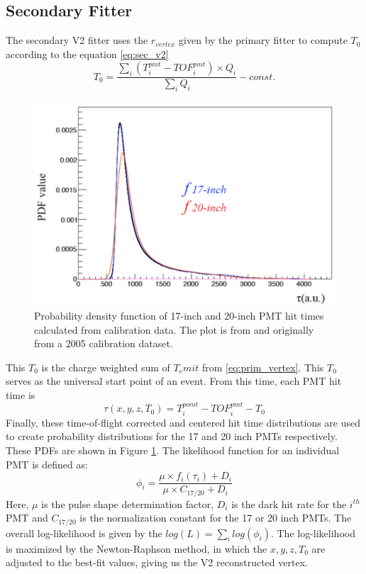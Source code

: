 \subsection{Secondary Fitter}
The secondary V2 fitter uses the $r_{vertex}$ given by the primary fitter to compute $T_0$ according to the equation \ref{eq:sec_v2}
\begin{equation}
	T_0 = \frac{\sum_i \left(T_i^{pmt}-TOF^{pmt}_i\right)\times Q_i}{\sum_iQ_i}- const.
	\label{eq:sec_v2}
\end{equation}
\begin{figure}[htb]
	\centering
	\includegraphics[scale=0.4]{pmt_dist.png}
	\caption{Probability density function of 17-inch and 20-inch PMT hit times calculated from calibration data. The plot is from \cite{ozaki_phd} and originally from a 2005 calibration dataset.}
	\label{fig:pmt_pdfs}
\end{figure}
This $T_0$ is the charge weighted sum of $T_emit$ from \ref{eq:prim_vertex}. This $T_0$ serves as the universal start point of an event. From this time, each PMT hit time is
\begin{equation}
	\tau(x,y,z,T_0) = T^{pomt}_i-TOF_i^{pmt}-T_0
\end{equation}
Finally, these time-of-flight corrected and centered hit time distributions are used to create probability distributions for the 17 and 20 inch PMTs respectively. These PDFs are shown in Figure \ref{fig:pmt_pdfs}. The likelihood function for an individual PMT is defined as:
\begin{equation}
	\phi_i =\frac{\mu\times f_i(\tau_i)+D_i}{\mu\times C_{17/20}+D_i}
\end{equation}
Here, $\mu$ is the pulse shape determination factor, $D_i$ is the dark hit rate for the $i^{th}$ PMT and $C_{17/20}$ is the normalization constant for the 17 or 20 inch PMTs. The overall log-likelihood is given by the $log(L)=\sum_ilog(\phi_i)$. The log-likelihood is maximized by the Newton-Raphson method, in which the $x,y,z,T_0$ are adjusted to the best-fit values, giving us the V2 reconstructed vertex.

